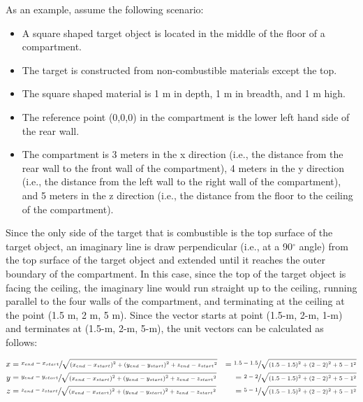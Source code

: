 As an example, assume the following scenario:

\begin{itemize}
\item A square shaped target object is located in the middle of the floor of a compartment.
\item The target is constructed from non-combustible materials except the top.
\item The square shaped material is 1 m in depth, 1 m in breadth, and 1 m high.
\item The reference point (0,0,0) in the compartment is the lower left hand side of the rear wall.
\item The compartment is 3 meters in the x direction (i.e., the distance from the rear wall to the front wall of the compartment), 4 meters in the y direction (i.e., the distance from the left wall to the right wall of the compartment), and 5 meters in the z direction (i.e., the distance from the floor to the ceiling of the compartment).
\end{itemize}

Since the only side of the target that is combustible is the top surface of the target object, an imaginary line is draw perpendicular (i.e., at a 90$^\circ$ angle) from the top surface of the target object and extended until it reaches the outer boundary of the compartment.  In this case, since the top of the target object is facing the ceiling, the imaginary line would run straight up to the ceiling, running parallel to the four walls of the compartment, and terminating at the ceiling at the point (1.5 m, 2 m, 5 m).  Since the vector starts at point (1.5-m, 2-m, 1-m) and terminates at (1.5-m, 2-m, 5-m), the unit vectors can be calculated as follows:


\begin{equation}
  \begin{aligned}
 x &= \sfrac{x_{end} - x_{start}}{\sqrt{{ \left( {x_{end} - x_{start}} \right) }^2 + { \left( {y_{end} - y_{start}} \right) }^2 + {z_{end} - z_{start}}^2}} &= \sfrac{1.5 - 1.5}{\sqrt{{ \left( {1.5 - 1.5} \right) }^2 + { \left( {2 - 2} \right) }^2 + {5 - 1}^2}} \\
 y &= \sfrac{y_{end} - y_{start}}{\sqrt{{ \left( {x_{end} - x_{start}} \right) }^2 + { \left( {y_{end} - y_{start}} \right) }^2 + {z_{end} - z_{start}}^2}} &= \sfrac{2 - 2}{\sqrt{{ \left( {1.5 - 1.5} \right) }^2 + { \left( {2 - 2} \right) }^2 + {5 - 1}^2}} \\
 z &= \sfrac{z_{end} - z_{start}}{\sqrt{{ \left( {x_{end} - x_{start}} \right) }^2 + { \left( {y_{end} - y_{start}} \right) }^2 + {z_{end} - z_{start}}^2}}  &= \sfrac{5 - 1}{\sqrt{{ \left( {1.5 - 1.5} \right) }^2 + { \left( {2 - 2} \right) }^2 + {5 - 1}^2}} \\
  \end{aligned}
\end{equation}

